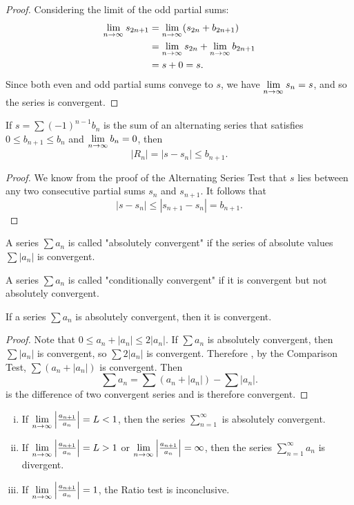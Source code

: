 \documentclass[a4paper,8pt]{article}
\begin{document}
\begin{outline}
\begin{proof}
      Considering the limit of the odd partial sums:
      \begin{align*}
        \lim\limits_{n\rightarrow \infty^{}} s_{2n+1} &= \lim\limits_{n\rightarrow \infty^{}} (s_{2n} + b_{2n+1}) \\
                                    &= \lim\limits_{n\rightarrow \infty^{}} s_{2n} + \lim\limits_{n\rightarrow \infty^{}} b_{2n+1} \\
                                    &= s + 0 = s\text{.}
      \end{align*}
      Since both even and odd partial sums convege to \(s\), we have \(\lim\limits_{n\rightarrow \infty^{}} s_n = s\), and so the series is convergent.
    \end{proof}

    If \(s = \sum (-1)^{n-1}b_n\) is the sum of an alternating series that satisfies \(0 \leq b_{n+1} \leq b_n\) and \(\lim\limits_{n\rightarrow \infty^{}} b_n = 0\),
    then \[ |R_n| = |s - s_n| \leq b_{n+1}\text{.} \]

    \begin{proof}
      We know from the proof of the Alternating Series Test that \(s\) lies between any two consecutive partial sums \(s_n\) and \(s_{n+1}\). It follows
      that \[ |s - s_n| \leq |s_{n+1} - s_n| = b_{n+1}\text{.} \]
    \end{proof}

    A series \(\sum a_n\) is called "absolutely convergent" if the series of absolute values \(\sum |a_n|\) is convergent.

    A series \(\sum a_n\) is called "conditionally convergent" if it is convergent but not absolutely convergent.

    If a series \(\sum a_n\) is absolutely convergent, then it is convergent.

    \begin{proof}
      Note that \(0 \leq a_n + |a_n| \leq 2|a_n|\). If \(\sum a_n\) is absolutely convergent, then \(\sum |a_n|\) is convergent, so \(\sum 2|a_n|\)
      is convergent. Therefore , by the Comparison Test, \(\sum (a_n + |a_n|)\) is convergent. Then
      \[ \sum a_n = \sum (a_n + |a_n|) - \sum |a_n|\text{.} \] is the difference of two convergent series and is therefore convergent.
    \end{proof}

    \begin{enumerate}[i.]
      \item
        If \(\lim\limits_{n\rightarrow \infty^{}}\left|\frac{a_{n+1}}{a_n}\right| = L < 1\), then the series \(\sum_{n=1}^{\infty}\) is absolutely convergent.
      \item
        If \(\lim\limits_{n\rightarrow \infty^{}}\left|\frac{a_{n+1}}{a_n}\right| = L > 1\) or \(\lim\limits_{n\rightarrow \infty^{}}\left|\frac{a_{n+1}}{a_n}\right| = \infty\),
        then the series \(\sum_{n=1}^{\infty} a_n\) is divergent.
      \item
        If \(\lim\limits_{n\rightarrow \infty^{}}\left|\frac{a_{n+1}}{a_n}\right| = 1\), the Ratio test is inconclusive.
    \end{enumerate}


\end{outline}
\end{document}

